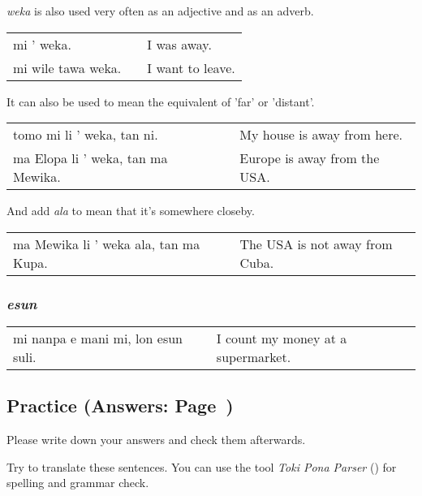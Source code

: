 %
\textit{weka} is also used very often as an adjective and as an adverb. 

\begin{supertabular}{p{5,5cm}|ll}
mi ' weka. && I was away. \\
mi wile tawa weka. && I want to leave. \\
\end{supertabular} 

It can also be used to mean the equivalent of 'far' or 'distant'. 

\begin{supertabular}{p{5,5cm}|ll}
tomo mi li ' weka, tan ni. && My house is away from here. \\
ma Elopa li ' weka, tan ma Mewika. && Europe is away from the USA. \\
\end{supertabular} 

And add \textit{ala} to mean that it's somewhere closeby. 

\begin{supertabular}{p{5,5cm}|ll}
ma Mewika li ' weka ala, tan ma Kupa. && The USA is not away from Cuba. \\
\end{supertabular} 

%
%
\subsubsection*{\textit{esun}}
%

\begin{supertabular}{p{5,5cm}|ll}
mi nanpa e mani mi, lon esun suli. && I count my money at a supermarket. \\
\end{supertabular}

%
%
%
\newpage
%
\subsection*{Practice (Answers: Page~\pageref{'numbers'})}
%
Please write down your answers and check them afterwards. 

Try to translate these sentences. 
You can use the tool \textit{Toki Pona Parser} (\cite{www:rowa:02}) for spelling and grammar check. 

